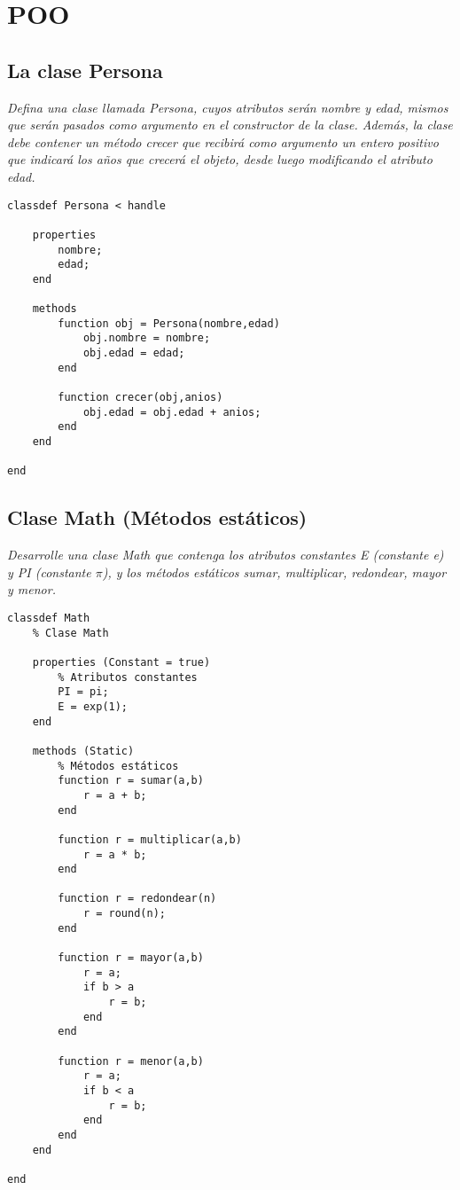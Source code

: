 \chapter{POO}

\section{La clase Persona}

\textit{Defina una clase llamada Persona, cuyos atributos serán nombre y edad, mismos que serán pasados como argumento en el constructor de la clase. Además, la clase debe contener un método crecer que recibirá como argumento un entero positivo que indicará los años que \textit{crecerá} el objeto, desde luego modificando el atributo edad.}

\sol

\begin{verbatim}
classdef Persona < handle
    
    properties
        nombre;
        edad;
    end
    
    methods
        function obj = Persona(nombre,edad)
            obj.nombre = nombre;
            obj.edad = edad;
        end
        
        function crecer(obj,anios)
            obj.edad = obj.edad + anios;
        end
    end
    
end
\end{verbatim}


\section{Clase Math (Métodos estáticos)}

\textit{Desarrolle una clase Math que contenga los atributos constantes E (constante e) y PI (constante $\pi$), y los métodos estáticos sumar, multiplicar, redondear, mayor y menor.}

\sol

\begin{verbatim}
classdef Math
    % Clase Math
    
    properties (Constant = true)
        % Atributos constantes
        PI = pi;
        E = exp(1);
    end
    
    methods (Static)
        % Métodos estáticos
        function r = sumar(a,b)
            r = a + b;
        end
        
        function r = multiplicar(a,b)
            r = a * b;
        end
        
        function r = redondear(n)
            r = round(n);
        end
        
        function r = mayor(a,b)
            r = a;
            if b > a
                r = b;
            end
        end
        
        function r = menor(a,b)
            r = a;
            if b < a
                r = b;
            end
        end
    end
    
end  
\end{verbatim}
